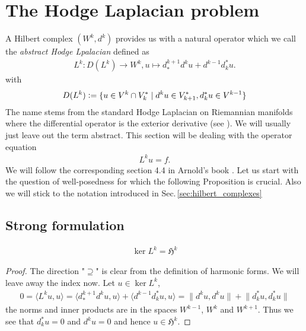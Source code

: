 \documentclass[../master_thesis.tex]{subfiles}
\begin{document}
\section{The Hodge Laplacian problem}

A Hilbert complex $(W^k, d^k)$ provides us with a natural operator which 
we call the \textit{abstract Hodge Lpalacian} defined as 
\begin{align*}
    L^k: D(L^k) \rightarrow W^k, u \mapsto d^{k+1}_* d^k u + d^{k-1} d^*_k u.
\end{align*}
with 
\begin{align*}
    D(L^k) \vcentcolon= \{ u \in V^k \cap V^*_k \mid d^k u \in V^*_{k+1}, d^*_k u \in V^{k-1} \}   
\end{align*}
The name stems from the standard Hodge Laplacian on Riemannian manifolds where the differential operator 
is the exterior derivative (see \cite{}). We will usually just leave out the term abstract.
This section will be dealing with the 
operator equation
\begin{align}
    L^k u = f.
\end{align}
We will follow the corresponding section 4.4 in Arnold's book \cite{arnold}.
Let us start with the question of well-posedness for which the following 
Proposition is crucial. Also we will stick to the notation introduced in Sec.\,\ref{sec:hilbert_complexes}

\subsection{Strong formulation}

\begin{proposition}
    \begin{align}
        \ker L^k = \mathfrak{H}^k \label{eq:hodge_laplacian_operator_eq}
    \end{align}
\end{proposition}
\begin{proof}
    The direction "$\supseteq$" is clear from the definition of harmonic forms.
    We will leave away the index now. Let $u \in \ker L^k$,
    \begin{align*}
        0 = \langle L^k u, u \rangle 
        = \langle d^{k+1}_* d^k u, u \rangle + \langle d^{k-1} d^*_k u, u \rangle
        = \lVert d^k u, d^k u \rVert + \lVert d^*_k u, d^*_k u \rVert
    \end{align*}
    the norms and inner products are in the spaces $W^{k-1}$, $W^{k}$ and $W^{k+1}$.
    Thus we see that $d^*_k u = 0$ and $d^k u = 0$ and hence $u \in \mathfrak{H}^k$.
\end{proof}
\end{document}
